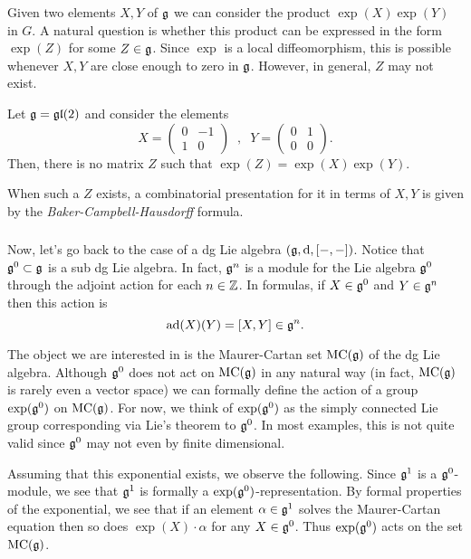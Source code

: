\documentclass[11pt]{amsart}
\begin{document}
Given two elements $X,Y$ of $\mathfrak g$ we can consider the product $\exp(X) \exp(Y)$ in $G$.
A natural question is whether this product can be expressed in the form $\exp(Z)$ for some $Z \in \mathfrak g$. 
Since $\exp$ is a local diffeomorphism, this is possible whenever $X,Y$ are close enough to zero in $\mathfrak g$.
However, in general, $Z$ may not exist. 

\begin{eg}
Let $\mathfrak g = {\mathfrak{gl}}(2)$ and consider the elements
\[
X = \left(\begin{array}{cc} 0 & -1 \\ 1 & 0 \end{array} \right) \;\; , \;\; Y = \left(\begin{array}{cc} 0 & 1 \\ 0 & 0 \end{array} \right) .
\] 
Then, there is no matrix $Z$ such that $\exp(Z) = \exp(X) \exp(Y)$.
\end{eg}

When such a $Z$ exists, a combinatorial presentation for it in terms of $X,Y$ is given by the {\em Baker-Campbell-Hausdorff} formula.

\subsubsection{}

Now, let's go back to the case of a dg Lie algebra $(\mathfrak g, {\rm d}, [-,-])$. 
Notice that $\mathfrak g^0 \subset \mathfrak g$ is a sub dg Lie algebra. 
In fact, $\mathfrak g^n$ is a module for the Lie algebra $\mathfrak g^0$ through the adjoint action for each $n \in \mathbb Z$.  
In formulas, if $X \in \mathfrak g^0$ and $Y \in \mathfrak g^n$ then this action is
\[
{\rm ad}(X) (Y) = [X,Y]  \in \mathfrak g^n .
\]

The object we are interested in is the Maurer-Cartan set ${\rm MC}(\mathfrak g)$ of the dg Lie algebra. 
Although $\mathfrak g^0$ does not act on ${\rm MC}(\mathfrak g)$ in any natural way (in fact, ${\rm MC}(\mathfrak g)$ is rarely even a vector space) we can formally define the action of a group $\exp(\mathfrak g^0)$ on ${\rm MC}(\mathfrak g)$. 
For now, we think of $\exp(\mathfrak g^0)$ as the simply connected Lie group corresponding via Lie's theorem to $\mathfrak g^0$. 
In most examples, this is not quite valid since $\mathfrak g^0$ may not even by finite dimensional. 

Assuming that this exponential exists, we observe the following. 
Since $\mathfrak g^1$ is a $\mathfrak g^0$-module, we see that $\mathfrak g^1$ is formally a $\exp(\mathfrak g^0)$-representation. 
By formal properties of the exponential, we see that if an element $\alpha \in \mathfrak g^1$ solves the Maurer-Cartan equation then so does $\exp(X) \cdot \alpha$ for any $X \in \mathfrak g^0$. 
Thus $\exp(\mathfrak g^0)$ acts on the set ${\rm MC}(\mathfrak g)$.
\end{document}
